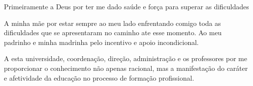 Primeiramente a Deus por ter me dado saúde e força para superar as dificuldades
	
A minha mãe por estar sempre ao meu lado enfrentando comigo toda as dificuldades que se apresentaram no caminho ate esse momento. Ao meu padrinho e minha madrinha pelo incentivo e apoio incondicional. 

A esta universidade, coordenação, direção, administração e os professores por me proporcionar o conhecimento não apenas racional, mas a manifestação do caráter e afetividade da educação no processo de formação profissional.